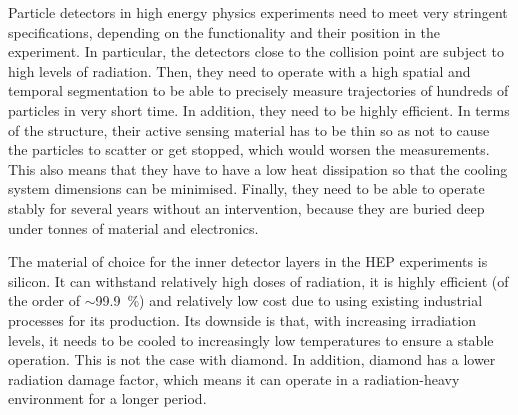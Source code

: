 
%
%
%
%
%
%
%
%
%
%
%


Particle detectors in high energy physics experiments need to meet very stringent specifications, depending on the functionality and their position in the experiment. In particular, the detectors close to the collision point are subject to high levels of radiation. Then, they need to operate with a high spatial and temporal segmentation to be able to precisely measure trajectories of hundreds of particles in very short time. In addition, they need to be highly efficient. In terms of the structure, their active sensing material has to be thin so as not to cause the particles to scatter or get stopped, which would worsen the measurements. This also means that they have to have a low heat dissipation so that the cooling system dimensions can be minimised. Finally, they need to be able to operate stably for several years without an intervention, because they are buried deep under tonnes of material and electronics. 

The material of choice for the inner detector layers in the HEP experiments is silicon. It can withstand relatively high doses of radiation, it is highly efficient (of the order of $\sim$99.9~\%) and relatively low cost due to using existing industrial processes for its production. Its downside is that, with increasing irradiation levels, it needs to be cooled to increasingly low temperatures to ensure a stable operation. This is not the case with diamond. In addition, diamond has a lower radiation damage factor, which means it can operate in a radiation-heavy environment for a longer period.

